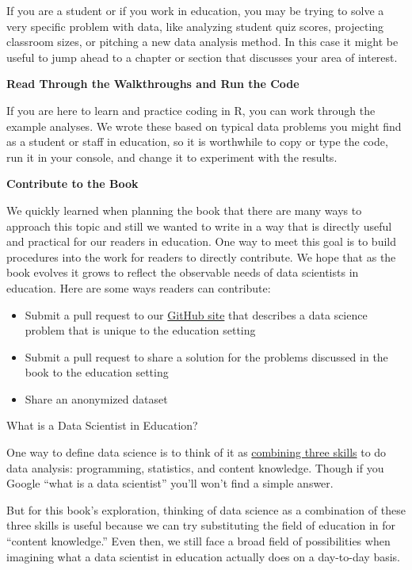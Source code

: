 \documentclass[]{book}
\providecommand{\tightlist}{%
  \setlength{\itemsep}{0pt}\setlength{\parskip}{0pt}}
\begin{document}
If you are a student or if you work in education, you may be trying to
solve a very specific problem with data, like analyzing student quiz
scores, projecting classroom sizes, or pitching a new data analysis
method. In this case it might be useful to jump ahead to a chapter or
section that discusses your area of interest.

\textbf{Read Through the Walkthroughs and Run the Code}

If you are here to learn and practice coding in R, you can work through
the example analyses. We wrote these based on typical data problems you
might find as a student or staff in education, so it is worthwhile to
copy or type the code, run it in your console, and change it to
experiment with the results.

\textbf{Contribute to the Book}

We quickly learned when planning the book that there are many ways to
approach this topic and still we wanted to write in a way that is
directly useful and practical for our readers in education. One way to
meet this goal is to build procedures into the work for readers to
directly contribute. We hope that as the book evolves it grows to
reflect the observable needs of data scientists in education. Here are
some ways readers can contribute:

\begin{itemize}
\tightlist
\item
  Submit a pull request to our
  \href{https://github.com/jrosen48/data-science-in-education}{GitHub
  site} that describes a data science problem that is unique to the
  education setting
\item
  Submit a pull request to share a solution for the problems discussed
  in the book to the education setting
\item
  Share an anonymized dataset
\end{itemize}

What is a Data Scientist in Education?

One way to define data science is to think of it as
\href{http://drewconway.com/zia/2013/3/26/the-data-science-venn-diagram}{combining
three skills} to do data analysis: programming, statistics, and content
knowledge. Though if you Google ``what is a data scientist'' you'll
won't find a simple answer.

But for this book's exploration, thinking of data science as a
combination of these three skills is useful because we can try
substituting the field of education in for ``content knowledge.'' Even
then, we still face a broad field of possibilities when imagining what a
data scientist in education actually does on a day-to-day basis.
\end{document}
